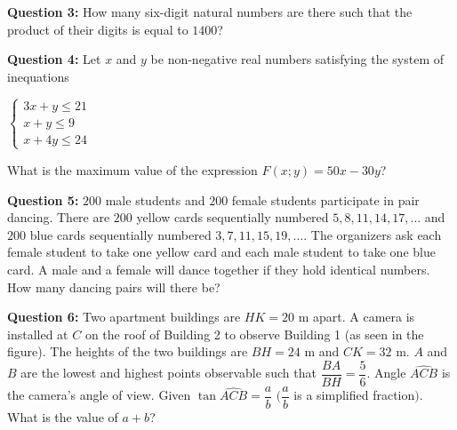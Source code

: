 \documentclass[12pt,a4paper]{article}
\newcommand{\Q}[1]{\textcolor{qblue}{\textbf{Question #1:}}}
\begin{document}
\Q{3} How many six-digit natural numbers are there such that the product of their digits is equal to $1400$?

\Q{4} Let $x$ and $y$ be non-negative real numbers satisfying the system of inequations\par
\hspace*{0.6cm}$\begin{cases}3x+y\le21\\ x+y\le9\\ x+4y\le24\end{cases}$\par
\hspace*{0.6cm}What is the maximum value of the expression $F(x;y)=50x-30y$?

\Q{5} $200$ male students and $200$ female students participate in pair dancing. There are $200$ yellow cards sequentially numbered $5,8,11,14,17,\ldots$ and $200$ blue cards sequentially numbered $3,7,11,15,19,\ldots$. The organizers ask each female student to take one yellow card and each male student to take one blue card. A male and a female will dance together if they hold identical numbers. How many dancing pairs will there be?

\begin{minipage}[t]{0.64\linewidth}
\Q{6} Two apartment buildings are $HK=20$ m apart. A camera is installed at $C$ on the roof of Building 2 to observe Building 1 (as seen in the figure). The heights of the two buildings are $BH=24$ m and $CK=32$ m. $A$ and $B$ are the lowest and highest points observable such that $\dfrac{BA}{BH}=\dfrac56$. Angle $\widehat{ACB}$ is the camera's angle of view. Given $\tan\widehat{ACB}=\dfrac{a}{b}$ $\Big(\dfrac{a}{b}$ is a simplified fraction$\Big)$. What is the value of $a+b$?
\end{minipage}\hfill
\begin{minipage}[t]{0.33\linewidth}
\vspace{0pt}\centering
{}
\end{minipage}
\end{document}
